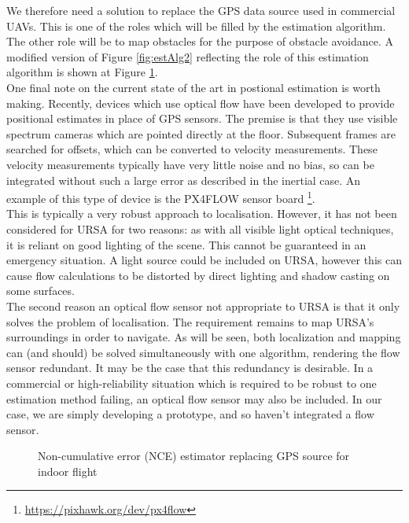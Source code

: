 \documentclass[capstone_report.tex]{subfiles}
\begin{document}
    We therefore need a solution to replace the GPS data source used in commercial UAVs. This is one of the roles which will be filled by the estimation algorithm. The other role will be to map obstacles for the purpose of obstacle avoidance. A modified version of Figure \ref{fig:estAlg2} reflecting the role of this estimation algorithm is shown at Figure \ref{fig:estAlg3}.\\

One final note on the current state of the art in postional estimation is worth making. Recently, devices which use optical flow have been developed to provide positional estimates in place of GPS sensors. The premise is that they use visible spectrum cameras which are pointed directly at the floor. Subsequent frames are searched for offsets, which can be converted to velocity measurements. These velocity measurements typically have very little noise and no bias, so can be integrated without such a large error as described in the inertial case. An example of this type of device is the PX4FLOW sensor board \footnote{\url{https://pixhawk.org/dev/px4flow}}. \\

This is typically a very robust approach to localisation. However, it has not been considered for URSA for two reasons: as with all visible light optical techniques, it is reliant on good lighting of the scene. This cannot be guaranteed in an emergency situation. A light source could be included on URSA, however this can cause flow calculations to be distorted by direct lighting and shadow casting on some surfaces.\\

The second reason an optical flow sensor not appropriate to URSA is that it only solves the problem of localisation. The requirement remains to map URSA's surroundings in order to navigate. As will be seen, both localization and mapping can (and should) be solved simultaneously with one algorithm, rendering the flow sensor redundant. It may be the case that this redundancy is desirable. In a commercial or high-reliability situation which is required to be robust to one estimation method failing, an optical flow sensor may also be included. In our case, we are simply developing a prototype, and so haven't integrated a flow sensor.

    \begin{figure}[H]
    	\centering
    	
    	\caption{Non-cumulative error (NCE) estimator replacing GPS source for indoor flight\label{fig:estAlg3}}
    \end{figure}
\end{document}
